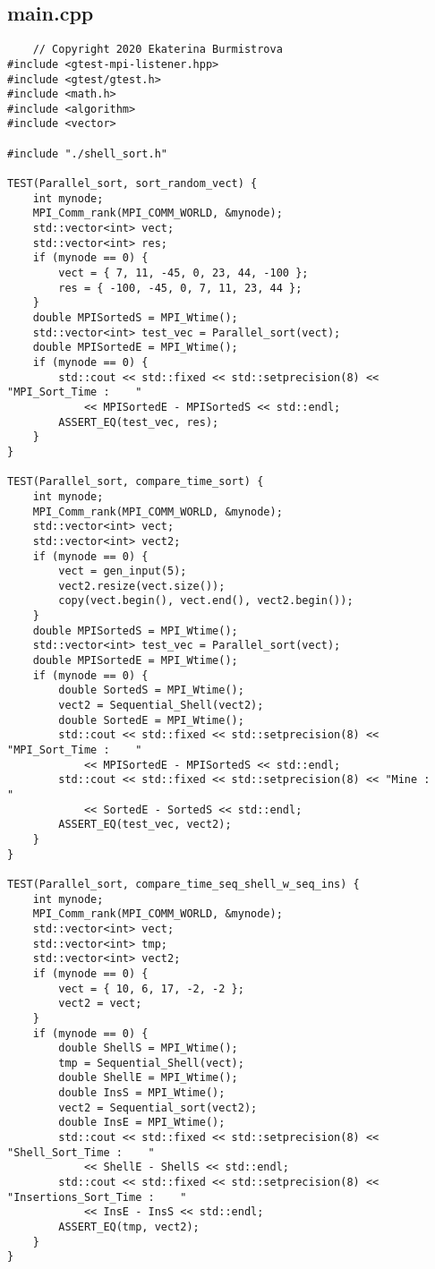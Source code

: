 \documentclass[12pt, letterpaper]{report}
\begin{document}
    \subsection*{main.cpp}
 	\begin{verbatim}
 	// Copyright 2020 Ekaterina Burmistrova
#include <gtest-mpi-listener.hpp>
#include <gtest/gtest.h>
#include <math.h>
#include <algorithm>
#include <vector>

#include "./shell_sort.h"

TEST(Parallel_sort, sort_random_vect) {
    int mynode;
    MPI_Comm_rank(MPI_COMM_WORLD, &mynode);
    std::vector<int> vect;
    std::vector<int> res;
    if (mynode == 0) {
        vect = { 7, 11, -45, 0, 23, 44, -100 };
        res = { -100, -45, 0, 7, 11, 23, 44 };
    }
    double MPISortedS = MPI_Wtime();
    std::vector<int> test_vec = Parallel_sort(vect);
    double MPISortedE = MPI_Wtime();
    if (mynode == 0) {
        std::cout << std::fixed << std::setprecision(8) << "MPI_Sort_Time :    "
            << MPISortedE - MPISortedS << std::endl;
        ASSERT_EQ(test_vec, res);
    }
}

TEST(Parallel_sort, compare_time_sort) {
    int mynode;
    MPI_Comm_rank(MPI_COMM_WORLD, &mynode);
    std::vector<int> vect;
    std::vector<int> vect2;
    if (mynode == 0) {
        vect = gen_input(5);
        vect2.resize(vect.size());
        copy(vect.begin(), vect.end(), vect2.begin());
    }
    double MPISortedS = MPI_Wtime();
    std::vector<int> test_vec = Parallel_sort(vect);
    double MPISortedE = MPI_Wtime();
    if (mynode == 0) {
        double SortedS = MPI_Wtime();
        vect2 = Sequential_Shell(vect2);
        double SortedE = MPI_Wtime();
        std::cout << std::fixed << std::setprecision(8) << "MPI_Sort_Time :    "
            << MPISortedE - MPISortedS << std::endl;
        std::cout << std::fixed << std::setprecision(8) << "Mine :    "
            << SortedE - SortedS << std::endl;
        ASSERT_EQ(test_vec, vect2);
    }
}

TEST(Parallel_sort, compare_time_seq_shell_w_seq_ins) {
    int mynode;
    MPI_Comm_rank(MPI_COMM_WORLD, &mynode);
    std::vector<int> vect;
    std::vector<int> tmp;
    std::vector<int> vect2;
    if (mynode == 0) {
        vect = { 10, 6, 17, -2, -2 };
        vect2 = vect;
    }
    if (mynode == 0) {
        double ShellS = MPI_Wtime();
        tmp = Sequential_Shell(vect);
        double ShellE = MPI_Wtime();
        double InsS = MPI_Wtime();
        vect2 = Sequential_sort(vect2);
        double InsE = MPI_Wtime();
        std::cout << std::fixed << std::setprecision(8) << "Shell_Sort_Time :    "
            << ShellE - ShellS << std::endl;
        std::cout << std::fixed << std::setprecision(8) << "Insertions_Sort_Time :    "
            << InsE - InsS << std::endl;
        ASSERT_EQ(tmp, vect2);
    }
}


\end{verbatim}
\end{document}
